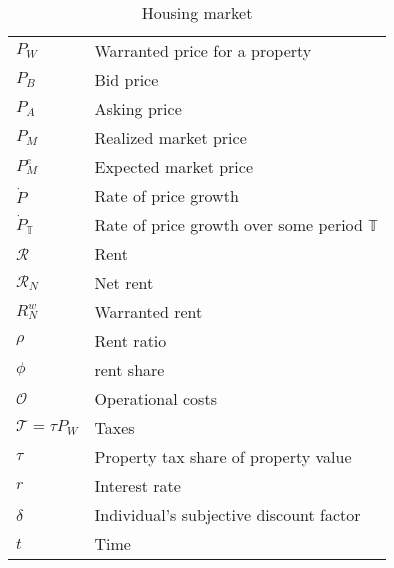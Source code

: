 \begin{longtable}{lp{10cm}}
\caption{Housing market}                                                            \\
\hline
$P_W$            &  Warranted price for a property       \\
$P_B$            &  Bid price                            \\ %
$P_A$            &  Asking price                         \\
$P_M$            &  Realized market price                \\
$P_M^e$          &  Expected market price                \\
$\dot P$         &  Rate of price growth                 \\
$\dot P_\mathbb{T}$ & Rate of price growth over some period $\mathbb{T}$ \\
$\mathcal{R}$    &  Rent                              \\
$\mathcal{R}_N$  &  Net rent                          \\
${R}^w_N$        &  Warranted rent                    \\
$\rho$           &  Rent ratio                        \\
$\phi$           &  \Gls{rent share}                  \\
$\mathcal{O}$    &  Operational costs                 \\
$\mathcal{T}=\tau P_W$    &  Taxes                             \\ %
$\tau$           &  Property tax share of property value               \\ %
$r$              &  Interest rate                     \\
$\delta$         &  Individual's subjective \gls{discount factor} \\
$t$              &  Time                              \\


\end{longtable}
